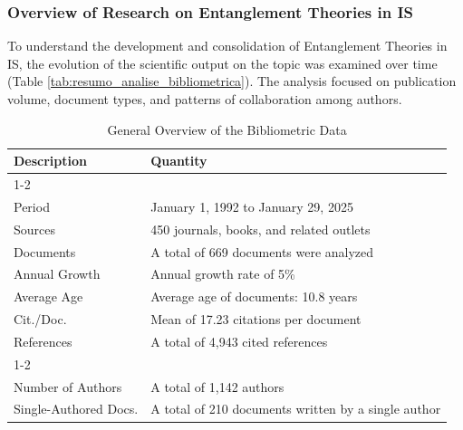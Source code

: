 \subsubsection{Overview of Research on Entanglement Theories in IS}\label{subsec:panorama_geral}

To understand the development and consolidation of Entanglement Theories in IS, the evolution of the scientific output on the topic was examined over time (Table \ref{tab:resumo_analise_bibliometrica}). The analysis focused on publication volume, document types, and patterns of collaboration among authors.


\begin{table}[ht!]
\centering
\scriptsize
\caption{General Overview of the Bibliometric Data}
\begin{tabular}{p{3.5cm}p{10.5cm}}

\toprule
\multicolumn{1}{l}{\textbf{Description}} & 
\multicolumn{1}{l}{\textbf{Quantity}}
\\

\cmidrule[0.4pt]{1-2}

\rowcolor{gray!10}
\multicolumn{2}{l}{\textbf{Main Information on the Data}}
\\

Period & January 1, 1992 to January 29, 2025
\\

Sources & 450 journals, books, and related outlets
\\

Documents & A total of 669 documents were analyzed\\

Annual Growth & Annual growth rate of 5\%
\\

Average Age & Average age of documents: 10.8 years
\\

Cit./Doc. & Mean of 17.23 citations per document
\\

References & A total of 4,943 cited references
\\

\cmidrule[0.4pt]{1-2}
\rowcolor{gray!10}
\multicolumn{2}{l}{\textbf{Authors}}
\\

Number of Authors & A total of 1,142 authors
\\

Single-Authored Docs. & A total of 210 documents written by a single author
\\


\end{tabular}
\end{table}
